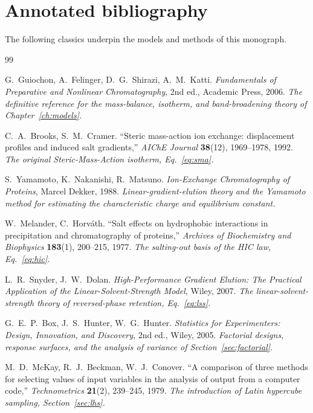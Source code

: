 \chapter*{Annotated bibliography}

The following classics underpin the models and methods of this monograph.

\begin{thebibliography}{99}

G.~Guiochon, A.~Felinger, D.~G.~Shirazi, A.~M.~Katti.
\textit{Fundamentals of Preparative and Nonlinear Chromatography},
2nd ed., Academic Press, 2006.
\emph{The definitive reference for the mass-balance, isotherm, and band-broadening
theory of Chapter~\ref{ch:models}.}

C.~A.~Brooks, S.~M.~Cramer.
``Steric mass-action ion exchange: displacement profiles and induced salt
gradients,'' \textit{AIChE Journal} \textbf{38}(12), 1969--1978, 1992.
\emph{The original Steric-Mass-Action isotherm, Eq.~\eqref{eq:sma}.}

S.~Yamamoto, K.~Nakanishi, R.~Matsuno.
\textit{Ion-Exchange Chromatography of Proteins}, Marcel Dekker, 1988.
\emph{Linear-gradient-elution theory and the Yamamoto method for estimating the
characteristic charge and equilibrium constant.}

W.~Melander, C.~Horv\'ath.
``Salt effects on hydrophobic interactions in precipitation and chromatography of
proteins,'' \textit{Archives of Biochemistry and Biophysics} \textbf{183}(1),
200--215, 1977.
\emph{The salting-out basis of the HIC law, Eq.~\eqref{eq:hic}.}

L.~R.~Snyder, J.~W.~Dolan.
\textit{High-Performance Gradient Elution: The Practical Application of the
Linear-Solvent-Strength Model}, Wiley, 2007.
\emph{The linear-solvent-strength theory of reversed-phase retention,
Eq.~\eqref{eq:lss}.}

G.~E.~P.~Box, J.~S.~Hunter, W.~G.~Hunter.
\textit{Statistics for Experimenters: Design, Innovation, and Discovery},
2nd ed., Wiley, 2005.
\emph{Factorial designs, response surfaces, and the analysis of variance of
Section~\ref{sec:factorial}.}

M.~D.~McKay, R.~J.~Beckman, W.~J.~Conover.
``A comparison of three methods for selecting values of input variables in the
analysis of output from a computer code,'' \textit{Technometrics} \textbf{21}(2),
239--245, 1979.
\emph{The introduction of Latin hypercube sampling, Section~\ref{sec:lhs}.}


\end{thebibliography}
